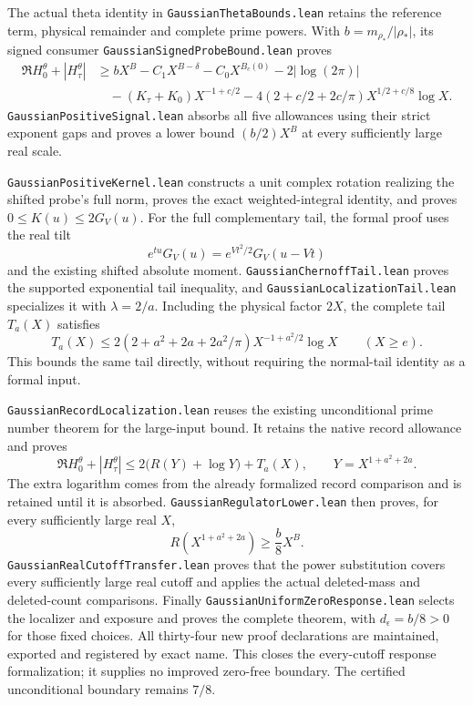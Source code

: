 \documentclass[11pt]{article}
\theoremstyle{definition}
\begin{document}
The actual theta identity in \texttt{Gaussian\allowbreak ThetaBounds.lean}
retains the reference term, physical remainder and complete prime
powers. With $b=m_{\rho_*}/|\rho_*|$, its signed consumer
\texttt{Gaussian\allowbreak SignedProbeBound.lean} proves
\[
 \begin{aligned}
 \Re H_0^\theta+|H_\tau^\theta|
 &\ge bX^B-C_1X^{B-\delta}-C_0X^{B_c(0)}
       -2|\log(2\pi)|\\
 &\quad -(K_\tau+K_0)X^{-1+c/2}
       -4(2+c/2+2c/\pi)X^{1/2+c/8}\log X .
 \end{aligned}
\]
\texttt{Gaussian\allowbreak PositiveSignal.lean} absorbs all five allowances
using their strict exponent gaps and proves a lower bound
$(b/2)X^B$ at every sufficiently large real scale.

\texttt{Gaussian\allowbreak PositiveKernel.lean} constructs a unit complex
rotation realizing the shifted probe's full norm, proves the exact
weighted-integral identity, and proves $0\le K(u)\le2G_V(u)$.
For the full complementary tail, the formal proof uses the real tilt
\[
 e^{tu}G_V(u)=e^{Vt^2/2}G_V(u-Vt)
\]
and the existing shifted absolute moment.
\texttt{Gaussian\allowbreak ChernoffTail.lean} proves the supported exponential
tail inequality, and \texttt{Gaussian\allowbreak LocalizationTail.lean}
specializes it with $\lambda=2/a$.
Including the physical factor $2X$, the complete tail $T_a(X)$ satisfies
\[
 T_a(X)\le
 2(2+a^2+2a+2a^2/\pi)X^{-1+a^2/2}\log X
 \qquad(X\ge e).
\]
This bounds the same tail directly, without requiring the normal-tail
identity as a formal input.

\texttt{Gaussian\allowbreak RecordLocalization.lean} reuses the existing
unconditional prime number theorem for the large-input bound.
It retains the native record allowance and proves
\[
 \Re H_0^\theta+|H_\tau^\theta|
 \le 2\bigl(R(Y)+\log Y\bigr)+T_a(X),\qquad Y=X^{1+a^2+2a}.
\]
The extra logarithm comes from the already formalized record
comparison and is retained until it is absorbed.
\texttt{Gaussian\allowbreak RegulatorLower.lean} then proves, for every
sufficiently large real $X$,
\[
 R\!\left(X^{1+a^2+2a}\right)\ge\frac{b}{8}X^B.
\]
\texttt{Gaussian\allowbreak RealCutoffTransfer.lean} proves that the power
substitution covers every sufficiently large real cutoff and applies
the actual deleted-mass and deleted-count comparisons.
Finally \texttt{Gaussian\allowbreak UniformZeroResponse.lean} selects the
localizer and exposure and proves the complete theorem, with
$d_\epsilon=b/8>0$ for those fixed choices.
All thirty-four new proof declarations are maintained, exported and
registered by exact name. This closes the every-cutoff response
formalization; it supplies no improved zero-free boundary.
The certified unconditional boundary remains $7/8$.
\end{document}
